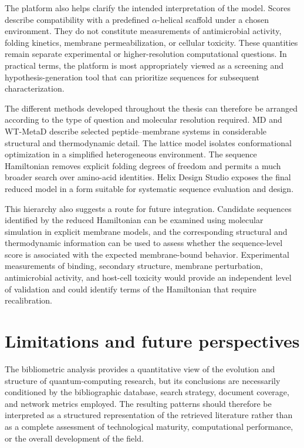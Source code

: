 The platform also helps clarify the intended interpretation of the model. Scores describe compatibility with a predefined $\alpha$-helical scaffold under a chosen environment. They do not constitute measurements of antimicrobial activity, folding kinetics, membrane permeabilization, or cellular toxicity. These quantities remain separate experimental or higher-resolution computational questions. In practical terms, the platform is most appropriately viewed as a screening and hypothesis-generation tool that can prioritize sequences for subsequent characterization.

The different methods developed throughout the thesis can therefore be arranged according to the type of question and molecular resolution required. MD and WT-MetaD describe selected peptide--membrane systems in considerable structural and thermodynamic detail. The lattice model isolates conformational optimization in a simplified heterogeneous environment. The sequence Hamiltonian removes explicit folding degrees of freedom and permits a much broader search over amino-acid identities. Helix Design Studio exposes the final reduced model in a form suitable for systematic sequence evaluation and design.

This hierarchy also suggests a route for future integration. Candidate sequences identified by the reduced Hamiltonian can be examined using molecular simulation in explicit membrane models, and the corresponding structural and thermodynamic information can be used to assess whether the sequence-level score is associated with the expected membrane-bound behavior. Experimental measurements of binding, secondary structure, membrane perturbation, antimicrobial activity, and host-cell toxicity would provide an independent level of validation and could identify terms of the Hamiltonian that require recalibration.





\section{Limitations and future perspectives}

The bibliometric analysis provides a quantitative view of the evolution and structure of quantum-computing research, but its conclusions are necessarily conditioned by the bibliographic database, search strategy, document coverage, and network metrics employed. The resulting patterns should therefore be interpreted as a structured representation of the retrieved literature rather than as a complete assessment of technological maturity, computational performance, or the overall development of the field.


